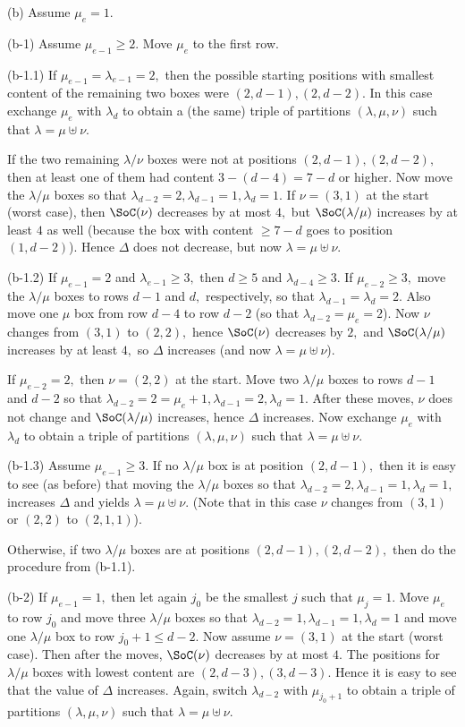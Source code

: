 \documentclass[12pt,dvipsnames,accepted=2016-08-18,a4paper,onecolumn]{quantumarticle}
\def\la{\lambda}
\def\la{\lambda}
\numberwithin{equation}{section}
\theoremstyle{definition}
\begin{document}
(b) Assume $\mu_e = 1.$ 

(b-1) Assume $\mu_{e-1} \geq 2.$ Move $\mu_e$ to the first row.

(b-1.1) If $\mu_{e-1} = \la_{e-1}=2,$ then the possible starting positions with smallest content of the remaining two boxes were 
$(2,d-1),(2,d-2).$ In this case exchange $\mu_e$ with $\la_d$ to obtain a (the same) triple of partitions $(\la,\mu,\nu)$ such that $\la = \mu \uplus \nu.$

If the two remaining $\la/\nu$ boxes were not at positions $(2,d-1),(2,d-2),$ then at least one of them had content $3-(d-4)=7-d$ or higher.
Now move the $\la/\mu$ boxes so that $\la_{d-2}=2,\la_{d-1}=1,\la_d=1.$
If $\nu=(3,1)$ at the start (worst case), then $\SoC(\nu)$ decreases by at most $4,$ but $\SoC(\la/\mu)$ increases by at least $4$ as well (because the box with content $\geq 7-d$ goes to position $(1,d-2)$). Hence $\Delta$ does not decrease, but now $\la = \mu \uplus \nu$.

(b-1.2) If $\mu_{e-1} = 2$ and $\la_{e-1} \geq 3,$ then $d\geq 5$ and $\la_{d-4}\geq 3.$ 
If $\mu_{e-2}\geq 3,$ move the $\la/\mu$ boxes to rows $d-1$ and $d,$ respectively, so that $\la_{d-1}=\la_d=2.$ Also move one $\mu$ box from row $d-4$ to row $d-2$ (so that $\la_{d-2}=\mu_e=2$). Now $\nu$ changes from $(3,1)$ to $(2,2),$ hence $\SoC(\nu)$ decreases by $2,$ and $\SoC(\la/\mu)$ increases by at least $4,$ so $\Delta$ increases (and now $\la = \mu \uplus \nu$). 

If $\mu_{e-2}=2,$ then $\nu=(2,2)$ at the start. Move two $\la/\mu$ boxes to rows $d-1$ and $d-2$ so that $\la_{d-2}=2 = \mu_e+1,\la_{d-1}=2,\la_d=1.$ After these moves, $\nu$ does not change and $\SoC(\la/\mu)$ increases, hence $\Delta$ increases. Now exchange $\mu_e$ with $\la_d$ to obtain a triple of partitions $(\la,\mu,\nu)$ such that $\la = \mu \uplus \nu.$

(b-1.3) Assume $\mu_{e-1}\geq3.$ If no $\la/\mu$ box is at position $(2,d-1),$ then it is easy to see (as before) that moving the $\la/\mu$ boxes so that $\la_{d-2}=2,\la_{d-1}=1,\la_d=1,$ increases $\Delta$ and yields $\la = \mu \uplus \nu$.   (Note that in this case $\nu$ changes from $(3,1)$ or $(2,2)$ to $(2,1,1)$).

Otherwise, if two $\la/\mu$ boxes are at positions $(2,d-1),(2,d-2),$ then do the procedure from (b-1.1).

(b-2) If $\mu_{e-1}=1,$ then let again $j_0$ be the smallest $j$ such that $\mu_j =1.$ Move $\mu_e$ to row $j_0$ and move three  $\la/\mu$ boxes so that $\la_{d-2}=1,\la_{d-1}=1,\la_d=1$ and move one $\la/\mu$ box to row $j_0+1 \leq d-2.$ Now assume $\nu=(3,1)$ at the start (worst case). 
Then after the moves, $\SoC(\nu)$ decreases by at most $4.$ The positions for $\la/\mu$ boxes with lowest content are $(2,d-3),(3,d-3).$ Hence it is easy to see that the value of $\Delta$ increases. Again, switch $\la_{d-2}$ with $\mu_{j_0+1}$ to obtain a triple of partitions $(\la,\mu,\nu)$ such that $\la = \mu \uplus \nu$.
\end{document}
